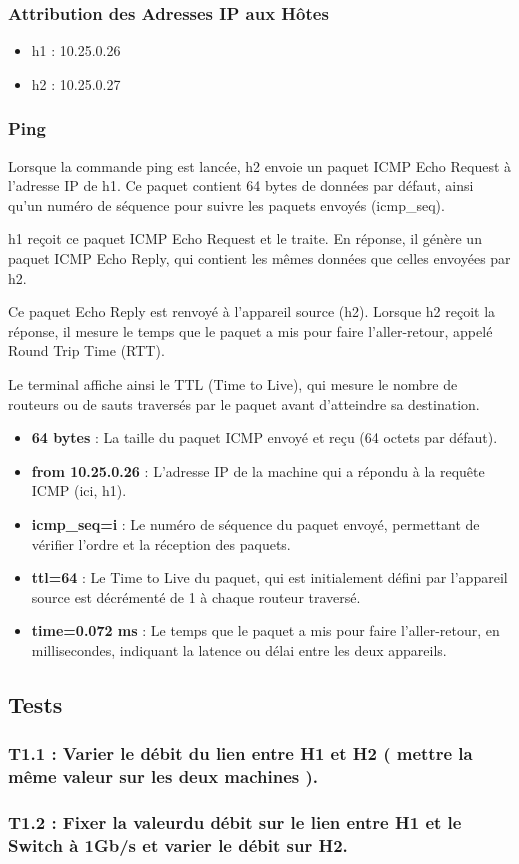 \subsubsection{Attribution des Adresses IP aux Hôtes}
\begin{itemize}
    \item h1 : 10.25.0.26
    \item h2 : 10.25.0.27
\end{itemize}


\subsubsection{Ping}
Lorsque la commande ping est lancée, h2 envoie un paquet ICMP Echo Request à l'adresse IP de h1. Ce paquet contient 64 bytes de données par défaut, ainsi qu'un numéro de séquence pour suivre les paquets envoyés (icmp\_seq).

h1 reçoit ce paquet ICMP Echo Request et le traite. En réponse, il génère un paquet ICMP Echo Reply, qui contient les mêmes données que celles envoyées par h2.

Ce paquet Echo Reply est renvoyé à l'appareil source (h2). Lorsque h2 reçoit la réponse, il mesure le temps que le paquet a mis pour faire l'aller-retour, appelé Round Trip Time (RTT).

Le terminal affiche ainsi le TTL (Time to Live), qui mesure le nombre de routeurs ou de sauts traversés par le paquet avant d'atteindre sa destination.

\begin{itemize}
    \item \textbf{64 bytes} : La taille du paquet ICMP envoyé et reçu (64 octets par défaut).
    \item \textbf{from 10.25.0.26} : L'adresse IP de la machine qui a répondu à la requête ICMP (ici, h1).
    \item \textbf{icmp\_seq=i} : Le numéro de séquence du paquet envoyé, permettant de vérifier l'ordre et la réception des paquets.
    \item \textbf{ttl=64} : Le Time to Live du paquet, qui est initialement défini par l'appareil source est décrémenté de 1 à chaque routeur traversé.
    \item \textbf{time=0.072 ms} : Le temps que le paquet a mis pour faire l’aller-retour, en millisecondes, indiquant la latence ou délai entre les deux appareils.
\end{itemize}

\subsection{Tests}
\subsubsection{T1.1 : Varier le débit du lien entre H1 et H2 ( mettre la même valeur sur les deux machines ).}
 
\subsubsection{T1.2 : Fixer la valeurdu débit sur le lien entre H1 et le Switch à 1Gb/s et varier le débit sur H2.}
